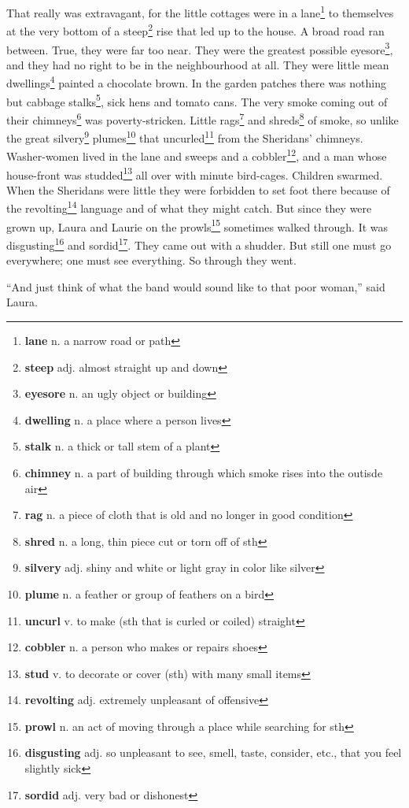 That really was extravagant, for the little cottages were in a lane\footnote{\textbf{lane} n. a narrow road or path} to themselves at the very bottom of a steep\footnote{\textbf{steep} adj. almost straight up and down} rise that led up to the house. A broad road ran between. True, they were far too near. They were the greatest possible eyesore\footnote{\textbf{eyesore} n. an ugly object or building}, and they had no right to be in the neighbourhood at all. They were little mean dwellings\footnote{\textbf{dwelling} n. a place where a person lives} painted a chocolate brown. In the garden patches there was nothing but cabbage stalks\footnote{\textbf{stalk} n. a thick or tall stem of a plant}, sick hens and tomato cans. The very smoke coming out of their chimneys\footnote{\textbf{chimney} n. a part of building through which smoke rises into the outisde air} was poverty-stricken. Little rags\footnote{\textbf{rag} n. a piece of cloth that is old and no longer in good condition} and shreds\footnote{\textbf{shred} n. a long, thin piece cut or torn off of sth} of smoke, so unlike the great silvery\footnote{\textbf{silvery} adj. shiny and white or light gray in color like silver} plumes\footnote{\textbf{plume} n. a feather or group of feathers on a bird} that uncurled\footnote{\textbf{uncurl} v. to make (sth that is curled or coiled) straight} from the Sheridans' chimneys. Washer-women lived in the lane and sweeps and a cobbler\footnote{\textbf{cobbler} n. a person who makes or repairs shoes}, and a man whose house-front was studded\footnote{\textbf{stud} v. to decorate or cover (sth) with many small items} all over with minute bird-cages. Children swarmed. When the Sheridans were little they were forbidden to set foot there because of the revolting\footnote{\textbf{revolting} adj. extremely unpleasant of offensive} language and of what they might catch. But since they were grown up, Laura and Laurie on the prowls\footnote{\textbf{prowl} n. an act of moving through a place while searching for sth} sometimes walked through. It was disgusting\footnote{\textbf{disgusting} adj. so unpleasant to see, smell, taste, consider, etc., that you feel slightly sick} and sordid\footnote{\textbf{sordid} adj. very bad or dishonest}. They came out with a shudder. But still one must go everywhere; one must see everything. So through they went.

``And just think of what the band would sound like to that poor woman,'' said Laura.

